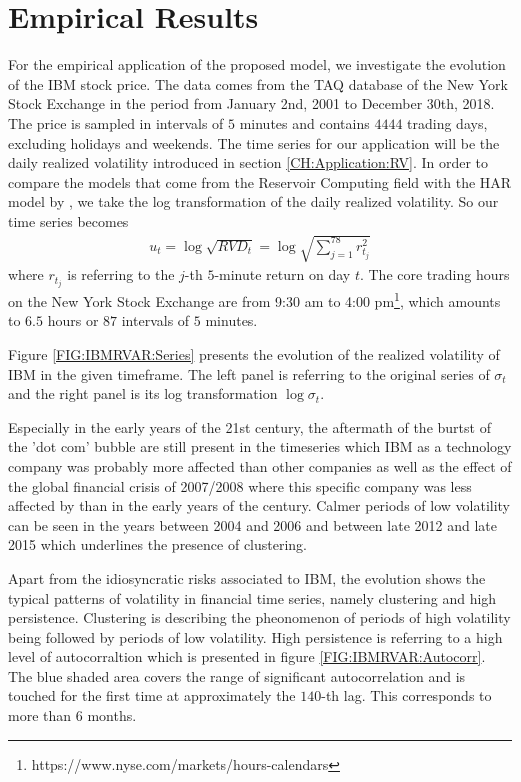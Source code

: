 \section{Empirical Results}
\label{CH:EmpiricalResults}


For the empirical application of the proposed model, we investigate the evolution of the IBM stock price. The data comes from the TAQ database of the New York Stock Exchange in the period from January 2nd, 2001 to December 30th, 2018. The price is sampled in intervals of $5$ minutes and contains $4444$ trading days, excluding holidays and weekends. The time series for our application will be the daily realized volatility introduced in section \ref{CH:Application:RV}. In order to compare the models that come from the Reservoir Computing field with the HAR model by \cite{Corsi2009}, we take the log transformation of the daily realized volatility. So our time series becomes
\begin{eqnarray}
    u_t = \log{\sqrt{RVD_t}} = \log{\sqrt{\sum_{j=1}^{78} r_{t_j}^2}}
\end{eqnarray}
where $r_{t_j}$ is referring to the $j$-th $5$-minute return on day $t$. The core trading hours on the New York Stock Exchange are from 9:30 am to 4:00 pm\footnote{https://www.nyse.com/markets/hours-calendars}, which amounts to $6.5$ hours or $87$ intervals of $5$ minutes.

Figure \ref{FIG:IBMRVAR:Series} presents the evolution of the realized volatility of IBM in the given timeframe. The left panel is referring to the original series of $\sigma_t$ and the right panel is its log transformation $\log{\sigma_t}$. 

Especially in the early years of the 21st century, the aftermath of the burtst of the 'dot com' bubble are still present in the timeseries which IBM as a technology company was probably more affected than other companies as well as the effect of the global financial crisis of 2007/2008 where this specific company was less affected by than in the early years of the century. Calmer periods of low volatility can be seen in the years between 2004 and 2006 and between late 2012 and late 2015 which underlines the presence of clustering.

Apart from the idiosyncratic risks associated to IBM, the evolution shows the typical patterns of volatility in financial time series, namely clustering and high persistence. Clustering is describing the pheonomenon of periods of high volatility being followed by periods of low volatility. High persistence is referring to a high level of autocorraltion which is presented in figure \ref{FIG:IBMRVAR:Autocorr}. The blue shaded area covers the range of significant autocorrelation and is touched for the first time at approximately the $140$-th lag. This corresponds to more than $6$ months. 


